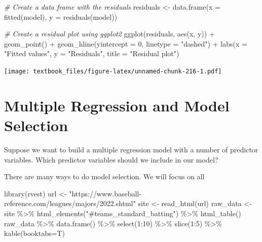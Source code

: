 \documentclass[
  11pt,
]{book}
\newenvironment{Shaded}{\begin{snugshade}}{\end{snugshade}}
\newcommand{\AttributeTok}[1]{\textcolor[rgb]{0.77,0.63,0.00}{#1}}
\newcommand{\CommentTok}[1]{\textcolor[rgb]{0.56,0.35,0.01}{\textit{#1}}}
\newcommand{\DecValTok}[1]{\textcolor[rgb]{0.00,0.00,0.81}{#1}}
\newcommand{\FunctionTok}[1]{\textcolor[rgb]{0.00,0.00,0.00}{#1}}
\newcommand{\NormalTok}[1]{#1}
\newcommand{\OtherTok}[1]{\textcolor[rgb]{0.56,0.35,0.01}{#1}}
\newcommand{\SpecialCharTok}[1]{\textcolor[rgb]{0.00,0.00,0.00}{#1}}
\newcommand{\StringTok}[1]{\textcolor[rgb]{0.31,0.60,0.02}{#1}}
\theoremstyle{definition}
\theoremstyle{definition}
\theoremstyle{definition}
\theoremstyle{definition}
\theoremstyle{remark}
\begin{document}
\begin{Shaded}
\begin{Highlighting}[]
\CommentTok{\# Create a data frame with the residuals}
\NormalTok{residuals }\OtherTok{\textless{}{-}} \FunctionTok{data.frame}\NormalTok{(}\AttributeTok{x =} \FunctionTok{fitted}\NormalTok{(model), }\AttributeTok{y =} \FunctionTok{residuals}\NormalTok{(model))}

\CommentTok{\# Create a residual plot using ggplot2}
\FunctionTok{ggplot}\NormalTok{(residuals, }\FunctionTok{aes}\NormalTok{(x, y)) }\SpecialCharTok{+}
  \FunctionTok{geom\_point}\NormalTok{() }\SpecialCharTok{+}
  \FunctionTok{geom\_hline}\NormalTok{(}\AttributeTok{yintercept =} \DecValTok{0}\NormalTok{, }\AttributeTok{linetype =} \StringTok{"dashed"}\NormalTok{) }\SpecialCharTok{+}
  \FunctionTok{labs}\NormalTok{(}\AttributeTok{x =} \StringTok{"Fitted values"}\NormalTok{, }\AttributeTok{y =} \StringTok{"Residuals"}\NormalTok{, }\AttributeTok{title =} \StringTok{"Residual plot"}\NormalTok{)}
\end{Highlighting}
\end{Shaded}

\texttt{[image: textbook\_files/figure-latex/unnamed-chunk-216-1.pdf]}

\newpage

\hypertarget{multiple-regression-and-model-selection}{%
\section{Multiple Regression and Model Selection}\label{multiple-regression-and-model-selection}}

Suppose we want to build a multiple regression model with a number of predictor variables. Which predictor variables should we include in our model?

There are many ways to do model selection. We will focus on all

\begin{Shaded}
\begin{Highlighting}[]
\FunctionTok{library}\NormalTok{(rvest)}
\NormalTok{url }\OtherTok{\textless{}{-}} \StringTok{"https://www.baseball{-}reference.com/leagues/majors/2022.shtml"}
\NormalTok{site }\OtherTok{\textless{}{-}} \FunctionTok{read\_html}\NormalTok{(url)}
\NormalTok{raw\_data }\OtherTok{\textless{}{-}}\NormalTok{ site }\SpecialCharTok{\%\textgreater{}\%} \FunctionTok{html\_elements}\NormalTok{(}\StringTok{"\#teams\_standard\_batting"}\NormalTok{) }\SpecialCharTok{\%\textgreater{}\%} \FunctionTok{html\_table}\NormalTok{()}
\NormalTok{raw\_data }\SpecialCharTok{\%\textgreater{}\%} \FunctionTok{data.frame}\NormalTok{() }\SpecialCharTok{\%\textgreater{}\%} \FunctionTok{select}\NormalTok{(}\DecValTok{1}\SpecialCharTok{:}\DecValTok{10}\NormalTok{) }\SpecialCharTok{\%\textgreater{}\%} \FunctionTok{slice}\NormalTok{(}\DecValTok{1}\SpecialCharTok{:}\DecValTok{5}\NormalTok{) }\SpecialCharTok{\%\textgreater{}\%} \FunctionTok{kable}\NormalTok{(}\AttributeTok{booktabs=}\NormalTok{T)}
\end{Highlighting}
\end{Shaded}
\end{document}
